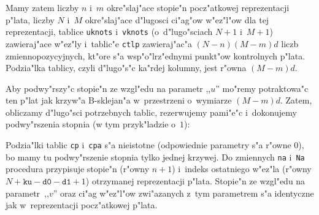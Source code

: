 Mamy zatem liczby $n$ i~$m$ okre"slaj"ace stopie"n pocz"atkowej
reprezentacji p"lata, liczby $N$ i~$M$ okre"slaj"ace d"lugosci ci"ag"ow
w"ez"l"ow dla tej reprezentacji, tablice \texttt{uknots} i~\texttt{vknots}
(o~d"lugo"sciach $N+1$ i~$M+1$) zawieraj"ace w"ez"ly i~tablic"e
\texttt{ctlp} zawieraj"ac"a $(N-n)(M-m)d$ liczb zmiennopozycyjnych,
kt"ore s"a wsp"o"lrz"ednymi punkt"ow kontrolnych p"lata. Podzia"lka tablicy,
czyli d"lugo"s"c ka"rdej kolumny, jest r"owna $(M-m)d$.

Aby podwy"rszy"c stopie"n ze wzgl"edu na parametr ,,$u$'' mo"remy
potraktowa"c ten p"lat jak krzyw"a B-sklejan"a w~przestrzeni o~wymiarze
$(M-m)d$. Zatem, obliczamy d"lugo"sci potrzebnych tablic, rezerwujemy
pami"e"c i~dokonujemy podwy"rszenia stopnia (w tym przyk"ladzie o~$1$):

\vspace{\medskipamount}
\vspace{\medskipamount}

\begin{sloppypar}
Podzia"lki tablic \texttt{cp} i~\texttt{cpa} s"a nieistotne (odpowiednie
parametry s"a r"owne $0$), bo mamy tu podwy"rszenie stopnia tylko jednej
krzywej. Do zmiennych \texttt{na} i~\texttt{Na} procedura przypisuje
stopie"n (r"owny $n+1$) i~indeks ostatniego w"ez"la (r"owny
\mbox{$N+\mathord{\texttt{ku}}-\mathord{\texttt{d0}}-\mathord{\texttt{d1}}+1$})
otrzymanej reprezentacji p"lata. Stopie"n ze
wzgl"edu na parametr~,,$v$'' oraz ci"ag w"ez\-"l"ow zwi"azanych z~tym
parametrem s"a identyczne jak w~reprezentacji pocz"atkowej p"lata.%
\end{sloppypar}

